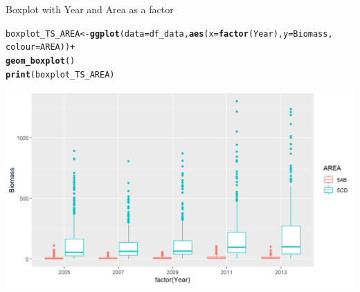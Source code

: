 \documentclass{beamer}\usepackage[]{graphicx}\usepackage[]{color}
\makeatletter
\newcommand{\hlopt}[1]{\textcolor[rgb]{0,0,0}{#1}}%
\newcommand{\hlstd}[1]{\textcolor[rgb]{0.345,0.345,0.345}{#1}}%
\newcommand{\hlkwb}[1]{\textcolor[rgb]{0.69,0.353,0.396}{#1}}%
\newcommand{\hlkwc}[1]{\textcolor[rgb]{0.333,0.667,0.333}{#1}}%
\newcommand{\hlkwd}[1]{\textcolor[rgb]{0.737,0.353,0.396}{\textbf{#1}}}%
\newenvironment{kframe}{%
 \def\at@end@of@kframe{}%
 \ifinner\ifhmode%
  \def\at@end@of@kframe{\end{minipage}}%
  \begin{minipage}{\columnwidth}%
 \fi\fi%
 \def\FrameCommand##1{\hskip\@totalleftmargin \hskip-\fboxsep
 \colorbox{shadecolor}{##1}\hskip-\fboxsep
     \hskip-\linewidth \hskip-\@totalleftmargin \hskip\columnwidth}%
 \MakeFramed {\advance\hsize-\width
   \@totalleftmargin\z@ \linewidth\hsize
   \@setminipage}}%
 {\par\unskip\endMakeFramed%
 \at@end@of@kframe}
\newenvironment{knitrout}{}{} %
\makeatother
\begin{document}
\begin{frame}[fragile]{Boxplot with Year and Area as a factor}
\begin{knitrout}\footnotesize
{}\color{fgcolor}\begin{kframe}
\begin{alltt}
\hlstd{boxplot_TS_AREA} \hlkwb{<-} \hlkwd{ggplot}\hlstd{(}\hlkwc{data}\hlstd{=df_data,} \hlkwd{aes}\hlstd{(}\hlkwc{x}\hlstd{=}\hlkwd{factor}\hlstd{(Year),} \hlkwc{y}\hlstd{=Biomass,}
                                            \hlkwc{colour}\hlstd{=AREA))} \hlopt{+}
  \hlkwd{geom_boxplot}\hlstd{()}
\hlkwd{print}\hlstd{(boxplot_TS_AREA)}
\end{alltt}
\end{kframe}

{\centering \includegraphics[width=.9\linewidth]{figure/boxplot_TSf_AREA-1} 

}



\end{knitrout}
\end{frame}
\end{document}
